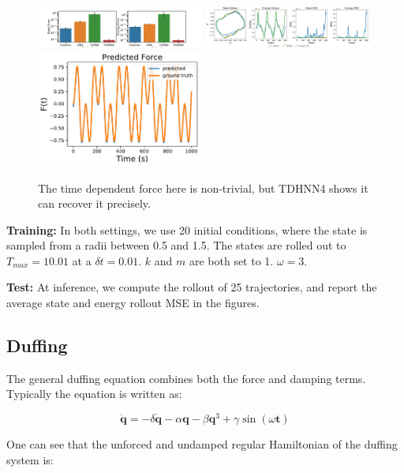 \documentclass[twoside]{article}
\begin{document}
\begin{figure}[h!]
\centering
\includegraphics[width=0.49\textwidth]{figures/mass_spring_forced_2_errors.pdf}
\includegraphics[width=0.49\textwidth]{figures/mass_spring_forced_2_pred.pdf}
\includegraphics[width=0.49\textwidth]{figures/TDHNN4_mass_spring_force_2.pdf}
\caption{The time dependent force here is non-trivial, but TDHNN4 shows it can recover it precisely.}
\end{figure}

\textbf{Training:} In both settings, we use 20 initial conditions, where the state is sampled from a radii between 0.5 and 1.5. The states are rolled out to $T_{max}=10.01$ at a $\delta t = 0.01$. $k$ and $m$ are both set to 1. $\omega =3$. 

\textbf{Test:} At inference, we compute the rollout of 25 trajectories, and report the average state and energy rollout MSE in the figures.

\subsection{Duffing}

The general duffing equation combines both the force and damping terms. Typically the equation is written as:

\begin{equation}
\ddot{\mathbf{q}} = -\delta \dot{\mathbf{q}} -\alpha \mathbf{q} -\beta \mathbf{q}^3 +\gamma \sin(\omega \mathbf{t}) 
\end{equation}

One can see that the unforced and undamped regular Hamiltonian of the duffing system is:
\end{document}
